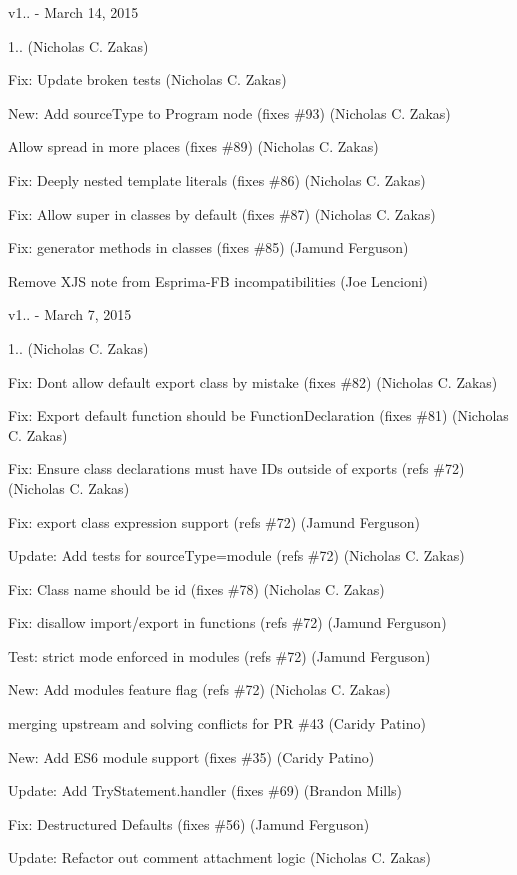 v1.. -\/ March 14, 2015


\begin{DoxyItemize}
\item 1.. (Nicholas C. Zakas)
\item Fix\+: Update broken tests (Nicholas C. Zakas)
\item New\+: Add source\+Type to Program node (fixes \#93) (Nicholas C. Zakas)
\item Allow spread in more places (fixes \#89) (Nicholas C. Zakas)
\item Fix\+: Deeply nested template literals (fixes \#86) (Nicholas C. Zakas)
\item Fix\+: Allow super in classes by default (fixes \#87) (Nicholas C. Zakas)
\item Fix\+: generator methods in classes (fixes \#85) (Jamund Ferguson)
\item Remove X\+JS note from Esprima-\/\+FB incompatibilities (Joe Lencioni)
\end{DoxyItemize}

v1.. -\/ March 7, 2015


\begin{DoxyItemize}
\item 1.. (Nicholas C. Zakas)
\item Fix\+: Don\textquotesingle{}t allow default export class by mistake (fixes \#82) (Nicholas C. Zakas)
\item Fix\+: Export default function should be Function\+Declaration (fixes \#81) (Nicholas C. Zakas)
\item Fix\+: Ensure class declarations must have I\+Ds outside of exports (refs \#72) (Nicholas C. Zakas)
\item Fix\+: export class expression support (refs \#72) (Jamund Ferguson)
\item Update\+: Add tests for source\+Type=module (refs \#72) (Nicholas C. Zakas)
\item Fix\+: Class name should be id (fixes \#78) (Nicholas C. Zakas)
\item Fix\+: disallow import/export in functions (refs \#72) (Jamund Ferguson)
\item Test\+: strict mode enforced in modules (refs \#72) (Jamund Ferguson)
\item New\+: Add modules feature flag (refs \#72) (Nicholas C. Zakas)
\item merging upstream and solving conflicts for PR \#43 (Caridy Patino)
\item New\+: Add E\+S6 module support (fixes \#35) (Caridy Patino)
\item Update\+: Add Try\+Statement.\+handler (fixes \#69) (Brandon Mills)
\item Fix\+: Destructured Defaults (fixes \#56) (Jamund Ferguson)
\item Update\+: Refactor out comment attachment logic (Nicholas C. Zakas)
\end{DoxyItemize}

